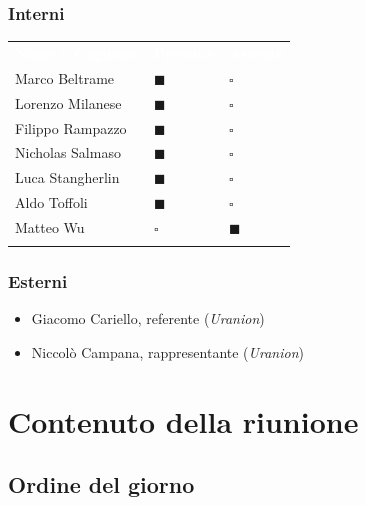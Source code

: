\documentclass[12pt,a4paper]{article}
\newcommand{\tightlist}{\setlength{\itemsep}{1pt}\setlength{\parskip}{0pt}}
\begin{document}
\hypertarget{interni}{%
\subsubsection{Interni}}

\begin{center}
\begin{tabularx}{\linewidth}{>{\raggedright\arraybackslash}X>{\centering\arraybackslash}p{2.5cm}>{\centering\arraybackslash}p{2.5cm}}
\rowcolor{bfblue}\textcolor{white}{\textbf{Nome e Cognome}} & \textcolor{white}{\textbf{Presente}} & \textcolor{white}{\textbf{Assente}} \\
Marco Beltrame & $\blacksquare$ & $\square$ \\ \arrayrulecolor{bfline}\hline
Lorenzo Milanese & $\blacksquare$ & $\square$ \\ \arrayrulecolor{bfline}\hline
Filippo Rampazzo & $\blacksquare$ & $\square$ \\ \arrayrulecolor{bfline}\hline
Nicholas Salmaso & $\blacksquare$ & $\square$ \\ \arrayrulecolor{bfline}\hline
Luca Stangherlin & $\blacksquare$ & $\square$ \\ \arrayrulecolor{bfline}\hline
Aldo Toffoli & $\blacksquare$ & $\square$ \\ \arrayrulecolor{bfline}\hline
Matteo Wu & $\square$ & $\blacksquare$ \\ \arrayrulecolor{bfline}\hline
\end{tabularx}
\end{center}

\hypertarget{esterni}{%
\subsubsection{Esterni}}

\begin{itemize}
\tightlist
\item
  Giacomo Cariello, referente (\emph{Uranion})
\item
  Niccolò Campana, rappresentante (\emph{Uranion})
\end{itemize}

\newpage
\hypertarget{contenuto-della-riunione}{%
\section{Contenuto della riunione}}

\hypertarget{ordine-del-giorno}{%
\subsection{Ordine del giorno}}
\end{document}

